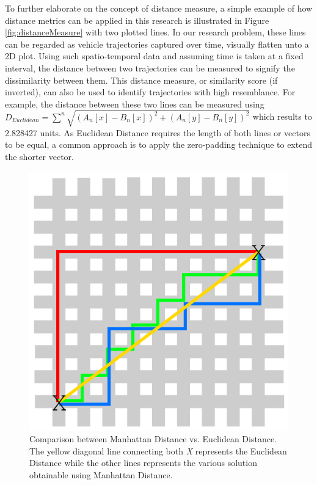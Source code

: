 To further elaborate on the concept of distance measure, a simple
example of how distance metrics can be applied in this research is
illustrated in Figure \ref{fig:distanceMeasure} with two plotted lines.
In our research problem, these lines can be regarded as vehicle
trajectories captured over time, visually flatten unto a 2D plot. Using such spatio-temporal data and assuming time is taken at a fixed interval, the distance between two trajectories can be measured to signify
the dissimilarity between them. This distance measure, or similarity score (if inverted), can also be used to
identify trajectories with high resemblance. For example, the distance between these two lines can be measured using $D_{Euclidean} = \sum^n\sqrt{{(A_n[x] - B_n[x])}^{2} +{(A_n[y] - B_n[y])}^{2}}$ which results to 2.828427 units. As Euclidean Distance requires the length of both lines or vectors to be equal, a common approach is to apply the zero-padding technique to extend the shorter vector.

\begin{figure}[hbt!]
 \centering
 \includegraphics[width=.5\textwidth]{image/lit/manhattan.png}
 \caption[Comparison between Manhattan Distance vs. Euclidean Distance]{Comparison between Manhattan Distance vs. Euclidean Distance. The yellow diagonal line connecting both \emph{X} represents the Euclidean Distance while the other lines represents the various solution obtainable using Manhattan Distance.}
 \label{fig:manhattan}
\end{figure}


